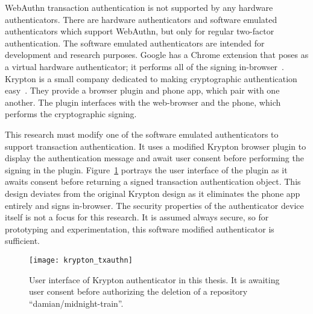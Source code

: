 

WebAuthn transaction authentication is not supported by any hardware authenticators. There are hardware authenticators and software emulated authenticators which support WebAuthn, but only for regular two-factor authentication. The software emulated authenticators are intended for development and research purposes. Google has a Chrome extension that poses as a virtual hardware authenticator; it performs all of the signing in-browser~\cite{virtual-authenticators-tab}. Krypton is a small company dedicated to making cryptographic authentication easy~\cite{krypton}. They provide a browser plugin and phone app, which pair with one another. The plugin interfaces with the web-browser and the phone, which performs the cryptographic signing. 

This research must modify one of the software emulated authenticators to support transaction authentication. It uses a modified Krypton browser plugin to display the authentication message and await user consent before performing the signing in the plugin. Figure~\ref{Fig:KryptonAuthenticator} portrays the user interface of the plugin as it awaits consent before returning a signed transaction authentication object. This design deviates from the original Krypton design as it eliminates the phone app entirely and signs in-browser. The security properties of the authenticator device itself is not a focus for this research. It is assumed always secure, so for prototyping and experimentation, this software modified authenticator is sufficient.

\begin{figure}[h]
  \centering
  \texttt{[image: krypton\_txauthn]}
  \caption{User interface of Krypton authenticator in this thesis. It is awaiting user consent before authorizing the deletion of a repository ``damian/midnight-train''.}
  \label{Fig:KryptonAuthenticator}
\end{figure}


